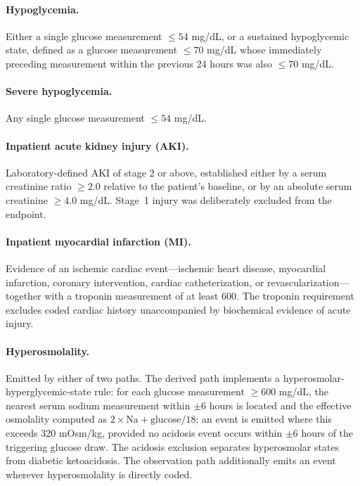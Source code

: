\paragraph{Hypoglycemia.}
Either a single glucose measurement $\leq54$ mg/dL, or a sustained
hypoglycemic state, defined as a glucose measurement $\leq70$ mg/dL whose
immediately preceding measurement within the previous 24 hours was also
$\leq70$ mg/dL.

\paragraph{Severe hypoglycemia.}
Any single glucose measurement $\leq54$ mg/dL.

\paragraph{Inpatient acute kidney injury (AKI).}
Laboratory-defined AKI of stage 2 or above, established either by a serum
creatinine ratio $\geq2.0$ relative to the patient's baseline, or by an
absolute serum creatinine $\geq4.0$ mg/dL. Stage~1 injury was deliberately
excluded from the endpoint.

\paragraph{Inpatient myocardial infarction (MI).}
Evidence of an ischemic cardiac event---ischemic heart disease, myocardial
infarction, coronary intervention, cardiac catheterization, or
revascularization---together with a troponin measurement of at least 600.
The troponin requirement excludes coded cardiac history unaccompanied by
biochemical evidence of acute injury.

\paragraph{Hyperosmolality.}
Emitted by either of two paths. The derived path implements a
hyperosmolar-hyperglycemic-state rule: for each glucose measurement
$\geq600$ mg/dL, the nearest serum sodium measurement within $\pm6$ hours is
located and the effective osmolality computed as
$2 \times \mathrm{Na} + \mathrm{glucose}/18$; an event is emitted where this
exceeds 320 mOsm/kg, provided no acidosis event occurs within $\pm6$ hours
of the triggering glucose draw. The acidosis exclusion separates
hyperosmolar states from diabetic ketoacidosis. The observation path
additionally emits an event wherever hyperosmolality is directly coded.

